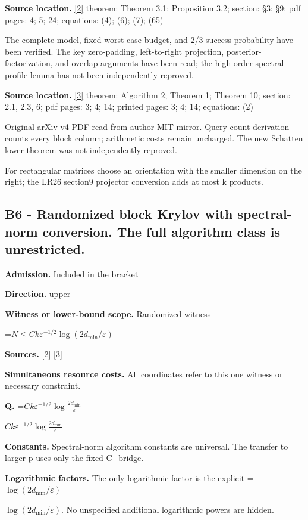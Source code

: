 \documentclass[10pt,a4paper]{article}
\newcommand{\AtlasMath}[1]{\par\begingroup\centering\setbox0=\hbox{$\displaystyle #1$}\ifdim\wd0>1.4\linewidth\typeout{ATLAS WIDE FORMULA: \the\wd0}\fi\ifdim\wd0>\linewidth\resizebox{\linewidth}{!}{\box0}\else\box0\fi\par\endgroup}
\newcommand{\AtlasInlineMath}[1]{\begingroup\setbox0=\hbox{$#1$}\ifdim\wd0>.4\linewidth\endgroup\AtlasMath{#1}\else\endgroup$#1$\fi}
\begin{document}
\textbf{Source location.} \href{https://arxiv.org/pdf/2609.35840v2}{[2]} theorem: Theorem 3.1; Proposition 3.2; section: §3; §9; pdf pages: 4; 5; 24; equations: (4); (6); (7); (65)

The complete model, fixed worst-case budget, and 2/3 success probability have been verified. The key zero-padding, left-to-right projection, posterior-factorization, and overlap arguments have been read; the high-order spectral-profile lemma has not been independently reproved.

\textbf{Source location.} \href{https://arxiv.org/pdf/1504.05477v4}{[3]} theorem: Algorithm 2; Theorem 1; Theorem 10; section: 2.1, 2.3, 6; pdf pages: 3; 4; 14; printed pages: 3; 4; 14; equations: (2)

Original arXiv v4 PDF read from author MIT mirror. Query-count derivation counts every block column; arithmetic costs remain uncharged. The new Schatten lower theorem was not independently reproved.

For rectangular matrices choose an orientation with the smaller dimension on the right; the LR26 section9 projector conversion adds at most k products.

\subsection{B6 - Randomized block Krylov with spectral-norm conversion. The full algorithm class is unrestricted.}
\textbf{Admission.} Included in the bracket

\textbf{Direction.} upper

\textbf{Witness or lower-bound scope.} Randomized witness

\AtlasMath{N\le Ck\varepsilon^{-1/2}\log(2d_{\mathrm{min}}/\varepsilon)}
\textbf{Sources.} \href{https://arxiv.org/pdf/2609.35840v2}{[2]} \href{https://arxiv.org/pdf/1504.05477v4}{[3]}

\textbf{Simultaneous resource costs.} All coordinates refer to this one witness or necessary constraint.

\textbf{Q.} \AtlasInlineMath{Ck\varepsilon^{-1/2}\log\!\frac{2d_{\mathrm{min}}}{\varepsilon}}

\textbf{Constants.} Spectral-norm algorithm constants are universal. The transfer to larger p uses only the fixed C\_bridge.

\textbf{Logarithmic factors.} The only logarithmic factor is the explicit \AtlasInlineMath{\log(2d_{\mathrm{min}}/\varepsilon)}. No unspecified additional logarithmic powers are hidden.
\end{document}
